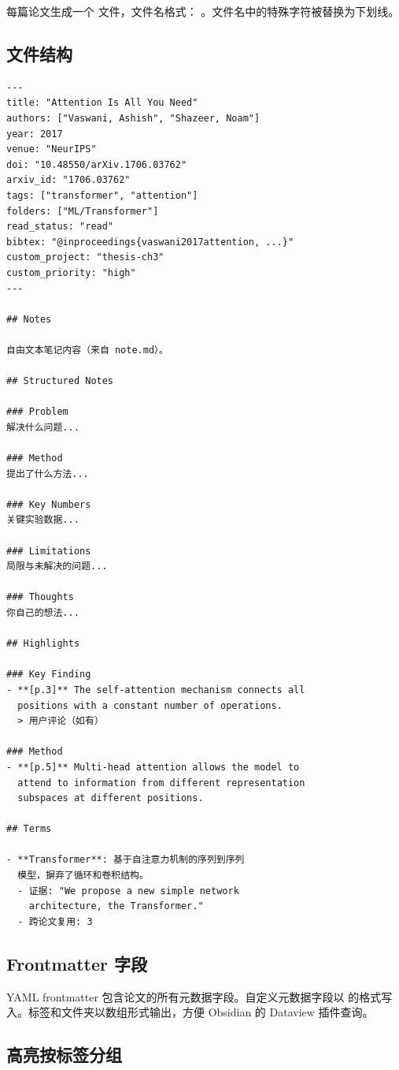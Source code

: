 每篇论文生成一个  文件，文件名格式：
。文件名中的特殊字符被替换为下划线。

\subsection{文件结构}

\begin{verbatim}
---
title: "Attention Is All You Need"
authors: ["Vaswani, Ashish", "Shazeer, Noam"]
year: 2017
venue: "NeurIPS"
doi: "10.48550/arXiv.1706.03762"
arxiv_id: "1706.03762"
tags: ["transformer", "attention"]
folders: ["ML/Transformer"]
read_status: "read"
bibtex: "@inproceedings{vaswani2017attention, ...}"
custom_project: "thesis-ch3"
custom_priority: "high"
---

## Notes

自由文本笔记内容（来自 note.md）。

## Structured Notes

### Problem
解决什么问题...

### Method
提出了什么方法...

### Key Numbers
关键实验数据...

### Limitations
局限与未解决的问题...

### Thoughts
你自己的想法...

## Highlights

### Key Finding
- **[p.3]** The self-attention mechanism connects all
  positions with a constant number of operations.
  > 用户评论（如有）

### Method
- **[p.5]** Multi-head attention allows the model to
  attend to information from different representation
  subspaces at different positions.

## Terms

- **Transformer**: 基于自注意力机制的序列到序列
  模型，摒弃了循环和卷积结构。
  - 证据: "We propose a new simple network
    architecture, the Transformer."
  - 跨论文复用: 3
\end{verbatim}

\subsection{Frontmatter 字段}

YAML frontmatter 包含论文的所有元数据字段。自定义元数据字段以
 的格式写入。标签和文件夹以数组形式输出，方便
Obsidian 的 Dataview 插件查询。

\subsection{高亮按标签分组}

